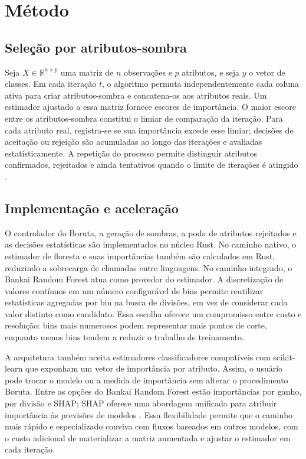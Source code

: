 \documentclass[a4,11pt]{wmecai}
\begin{document}
\section{Método}
\subsection{Seleção por atributos-sombra}
Seja $X\in\mathbb{R}^{n\times p}$ uma matriz de $n$ observações e $p$ atributos, e seja $y$ o vetor de classes. Em cada iteração $t$, o algoritmo permuta independentemente cada coluna ativa para criar atributos-sombra e concatena-os aos atributos reais. Um estimador ajustado a essa matriz fornece escores de importância. O maior escore entre os atributos-sombra constitui o limiar de comparação da iteração. Para cada atributo real, registra-se se sua importância excede esse limiar; decisões de aceitação ou rejeição são acumuladas ao longo das iterações e avaliadas estatisticamente. A repetição do processo permite distinguir atributos confirmados, rejeitados e ainda tentativos quando o limite de iterações é atingido \cite{Kursa}.

\subsection{Implementação e aceleração}
O controlador do Boruta, a geração de sombras, a poda de atributos rejeitados e as decisões estatísticas são implementados no núcleo Rust. No caminho nativo, o estimador de floresta e suas importâncias também são calculados em Rust, reduzindo a sobrecarga de chamadas entre linguagens. No caminho integrado, o Bankai Random Forest atua como provedor do estimador. A discretização de valores contínuos em um número configurável de bins permite reutilizar estatísticas agregadas por bin na busca de divisões, em vez de considerar cada valor distinto como candidato. Essa escolha oferece um compromisso entre custo e resolução: bins mais numerosos podem representar mais pontos de corte, enquanto menos bins tendem a reduzir o trabalho de treinamento.

A arquitetura também aceita estimadores classificadores compatíveis com scikit-learn que exponham um vetor de importância por atributo. Assim, o usuário pode trocar o modelo ou a medida de importância sem alterar o procedimento Boruta. Entre as opções do Bankai Random Forest estão importâncias por ganho, por divisão e SHAP; SHAP oferece uma abordagem unificada para atribuir importância às previsões de modelos \cite{Lundberg}. Essa flexibilidade permite que o caminho mais rápido e especializado conviva com fluxos baseados em outros modelos, com o custo adicional de materializar a matriz aumentada e ajustar o estimador em cada iteração.
\end{document}
